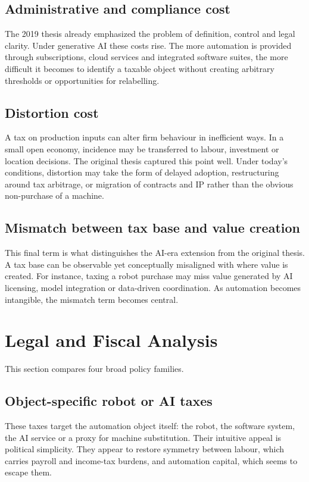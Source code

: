 \documentclass[11pt]{article}
\begin{document}
\subsection{Administrative and compliance cost}
The 2019 thesis already emphasized the problem of definition, control and legal clarity. Under generative AI these costs rise. The more automation is provided through subscriptions, cloud services and integrated software suites, the more difficult it becomes to identify a taxable object without creating arbitrary thresholds or opportunities for relabelling.

\subsection{Distortion cost}
A tax on production inputs can alter firm behaviour in inefficient ways. In a small open economy, incidence may be transferred to labour, investment or location decisions. The original thesis captured this point well. Under today's conditions, distortion may take the form of delayed adoption, restructuring around tax arbitrage, or migration of contracts and IP rather than the obvious non-purchase of a machine.

\subsection{Mismatch between tax base and value creation}
This final term is what distinguishes the AI-era extension from the original thesis. A tax base can be observable yet conceptually misaligned with where value is created. For instance, taxing a robot purchase may miss value generated by AI licensing, model integration or data-driven coordination. As automation becomes intangible, the mismatch term becomes central.

\section{Legal and Fiscal Analysis}
This section compares four broad policy families.

\subsection{Object-specific robot or AI taxes}
These taxes target the automation object itself: the robot, the software system, the AI service or a proxy for machine substitution. Their intuitive appeal is political simplicity. They appear to restore symmetry between labour, which carries payroll and income-tax burdens, and automation capital, which seems to escape them.
\end{document}
